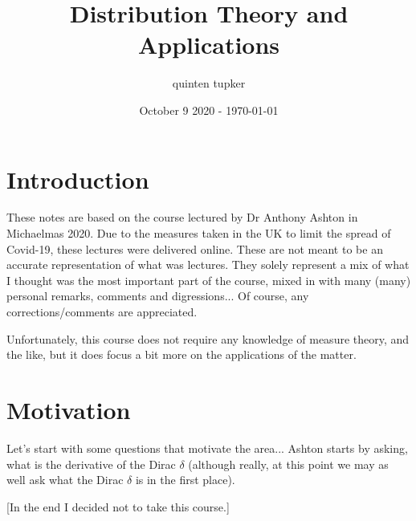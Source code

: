 \documentclass{article}
\title{Distribution Theory and Applications}
\author{quinten tupker}
\date{October 9 2020 - \today}
\theoremstyle{definition}
\begin{document}
\maketitle

\section*{Introduction}

These notes are based on the course lectured by Dr Anthony Ashton in Michaelmas
2020. Due to the measures taken in the UK to limit the spread of
Covid-19, these lectures were delivered online. These are not meant to be an
accurate representation of what was lectures. They solely represent a mix of
what I thought was the most important part of the course, mixed in with many
(many) personal remarks, comments and digressions... Of course, any
corrections/comments are appreciated.

Unfortunately, this course does not require any knowledge of measure theory, and
the like, but it does focus a bit more on the applications of the matter.

\section{Motivation}

Let's start with some questions that motivate the area... Ashton starts by
asking, what is the derivative of the Dirac $\delta$ (although really, at this
point we may as well ask what the Dirac $\delta$ is in the first place).

[In the end I decided not to take this course.]
\end{document}
